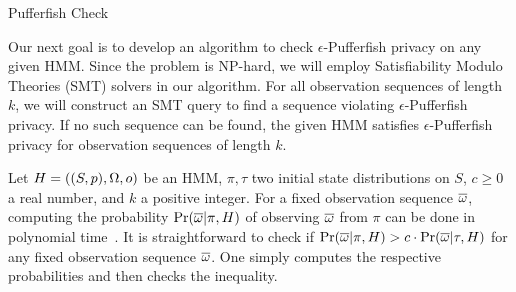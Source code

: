 
\begin{algorithm}
  \begin{algorithmic}[1]
       \EndFor
         \EndFor
       \EndFor
     \EndFunction
 \end{algorithmic}
 \caption{Pufferfish Check}
 \label{algorithm:pufferfish-check}
\end{algorithm}

Our next goal is to develop an algorithm to check
$\epsilon$-Pufferfish privacy on any given HMM. Since the problem is
NP-hard, we will employ Satisfiability Modulo Theories (SMT) solvers
in our algorithm. For all observation sequences of length $k$, we will 
construct an SMT query to find a sequence violating
$\epsilon$-Pufferfish privacy. If no such sequence can be found, the
given HMM satisfies $\epsilon$-Pufferfish privacy for observation
sequences of length $k$.

Let $H = ((S, p), \Omega, o)$ be an HMM, $\pi, \tau$ two initial state
distributions on $S$, $c \geq 0$ a real number, and $k$ a positive
integer. For a fixed observation sequence $\overline{\omega}$,
computing the probability $\Pr (\overline{\omega} | \pi, 
H)$ of observing $\overline{\omega}$ from $\pi$ can be done in
polynomial time~\cite{R:89:ATHMM}. It is straightforward to check if
$\Pr (\overline{\omega} | \pi, H) > c \cdot \Pr (\overline{\omega} |
\tau, H)$ for any fixed observation sequence $\overline{\omega}$. One
simply computes the respective probabilities and then checks the
inequality. 

